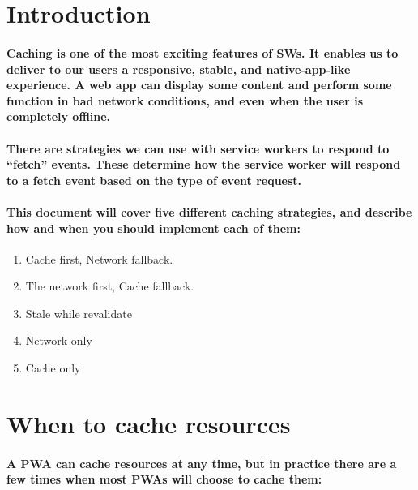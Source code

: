\documentclass[12pt,a4paper]{article}
\begin{document}
	
	
	\section{Introduction}

    \paragraph{Caching is one of the most exciting features of SWs. It enables us to deliver to our users a responsive, stable, and native-app-like experience. A web app can display some content and perform some function in bad network conditions, and even when the user is completely offline.}
    
    \paragraph{There are strategies we can use with service workers to respond to “fetch” events. These determine how the service worker will respond to a fetch event based on the type of event request.}
    
    \paragraph{This document will cover five different caching strategies, and describe how and when you should implement each of them:}

    \begin{enumerate}
    
        \item Cache first, Network fallback.
        \item The network first, Cache fallback.
        \item Stale while revalidate
        \item Network only
        \item Cache only
      
    \end{enumerate}

    \section{When to cache resources}

    \paragraph{A PWA can cache resources at any time, but in practice there are a few times when most PWAs will choose to cache them:}
\end{document}
